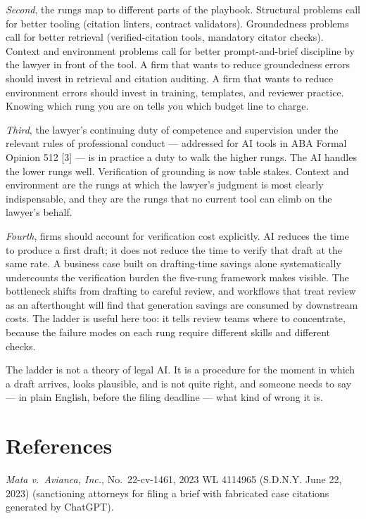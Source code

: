 \documentclass[11pt,a4paper]{article}
\begin{document}
\emph{Second}, the rungs map to different parts of the playbook.
Structural problems call for better tooling (citation linters,
contract validators). Groundedness problems call for better
retrieval (verified-citation tools, mandatory citator checks).
Context and environment problems call for better prompt-and-brief
discipline by the lawyer in front of the tool. A firm that wants
to reduce groundedness errors should invest in retrieval and
citation auditing. A firm that wants to reduce environment errors
should invest in training, templates, and reviewer practice.
Knowing which rung you are on tells you which budget line to
charge.

\emph{Third}, the lawyer's continuing duty of competence and
supervision under the relevant rules of professional conduct ---
addressed for AI tools in ABA Formal Opinion 512 [3] --- is in
practice a duty to walk the higher rungs. The AI handles the
lower rungs well. Verification of grounding is now table stakes.
Context and environment are the rungs at which the lawyer's
judgment is most clearly indispensable, and they are the rungs
that no current tool can climb on the lawyer's behalf.

\emph{Fourth}, firms should account for verification cost
explicitly. AI reduces the time to produce a first draft; it
does not reduce the time to verify that draft at the same rate.
A business case built on drafting-time savings alone
systematically undercounts the verification burden the five-rung
framework makes visible. The bottleneck shifts from drafting to
careful review, and workflows that treat review as an afterthought
will find that generation savings are consumed by downstream costs.
The ladder is useful here too: it tells review teams where to
concentrate, because the failure modes on each rung require
different skills and different checks.

The ladder is not a theory of legal AI. It is a procedure for the
moment in which a draft arrives, looks plausible, and is not quite
right, and someone needs to say --- in plain English, before the
filing deadline --- what kind of wrong it is.

\section*{References}

\noindent
[1] \emph{Mata v.~Avianca, Inc.}, No.~22-cv-1461, 2023 WL 4114965
(S.D.N.Y. June 22, 2023) (sanctioning attorneys for filing a brief
with fabricated case citations generated by ChatGPT).
\end{document}
